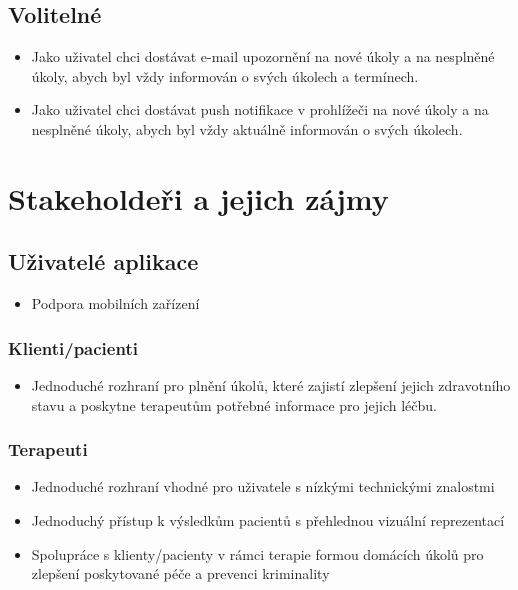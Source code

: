 \subsection{Volitelné}\label{subsec:volitelne}

\begin{itemize}
  \item
  Jako uživatel chci dostávat e-mail upozornění na nové úkoly a na nesplněné úkoly, abych byl vždy informován o svých úkolech a termínech.
  \item
  Jako uživatel chci dostávat push notifikace v prohlížeči na nové úkoly a na nesplněné úkoly, abych byl vždy aktuálně informován o svých úkolech.
\end{itemize}

\section{Stakeholdeři a jejich zájmy}\label{sec:stakeholderi}

\subsection*{Uživatelé aplikace}\label{subsec:uzivatele-aplikace}

\begin{itemize}
  \item
  Podpora mobilních zařízení
\end{itemize}

\subsubsection*{Klienti/pacienti}\label{subsubsec:klientipacienti}

\begin{itemize}
  \item
  Jednoduché rozhraní pro plnění úkolů, které zajistí zlepšení jejich
  zdravotního stavu a poskytne terapeutům potřebné informace pro jejich
  léčbu.
\end{itemize}

\subsubsection*{Terapeuti}\label{subsubsec:terapeuti}

\begin{itemize}
  \item
  Jednoduché rozhraní vhodné pro uživatele s nízkými technickými
  znalostmi
  \item
  Jednoduchý přístup k výsledkům pacientů s přehlednou vizuální
  reprezentací
  \item
  Spolupráce s klienty/pacienty v rámci terapie formou domácích úkolů
  pro zlepšení poskytované péče a prevenci kriminality
\end{itemize}

